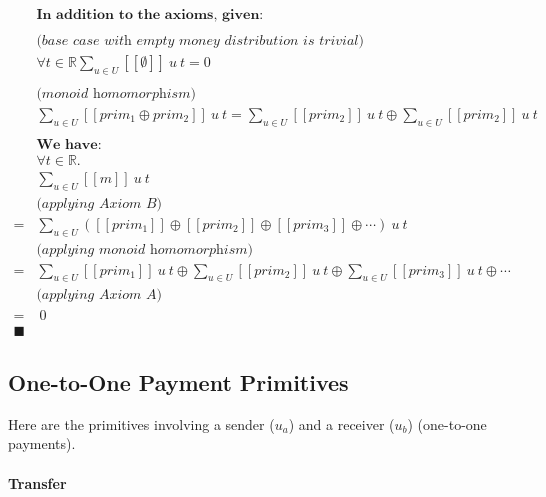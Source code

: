 \begin{equation}
    \begin{split}
        &\textbf{In addition to the axioms, given:} \\
        \\
        &\textit{(base case with empty money distribution is trivial)} \\
        &\forall t \in \mathbb{R} {\displaystyle \sum_{u \in U} [\![\emptyset]\!]\ u\ t = 0} \\
        \\
        &\textit{(monoid homomorphism)} \\
        &{\displaystyle \sum_{u \in U} [\![prim_1 \oplus prim_2]\!]\ u\ t} =
          {\displaystyle \sum_{u \in U} [\![prim_2]\!]\ u\ t} \oplus
          {\displaystyle \sum_{u \in U} [\![prim_2]\!]\ u\ t} \\
        \\
        &\textbf{We have:} \\
        &\forall t \in \mathbb{R}. \\
        &{\displaystyle \sum_{u \in U} [\![m]\!]\ u\ t} \\
        &\textit{(applying Axiom B)} \\
        = &{\displaystyle \sum_{u \in U}
            ([\![prim_1]\!] \oplus
            [\![prim_2]\!] \oplus
            [\![prim_3]\!]\oplus \dotsb)
        }\ u\ t
        \\
        &\textit{(applying monoid homomorphism)} \\
        = &{\displaystyle \sum_{u \in U} [\![prim_1]\!]\ u\ t} \oplus
        {\displaystyle \sum_{u \in U} [\![prim_2]\!]\ u\ t} \oplus
        {\displaystyle \sum_{u \in U} [\![prim_3]\!]\ u\ t} \oplus \dotsb
        \\
        &\textit{(applying Axiom A)} \\
        =&\ 0
        \\
        \blacksquare
    \end{split}
\end{equation}

\subsection{One-to-One Payment Primitives}

Here are the primitives involving a sender ($u_a$) and a receiver ($u_b$) (one-to-one payments).

\paragraph{Transfer}

